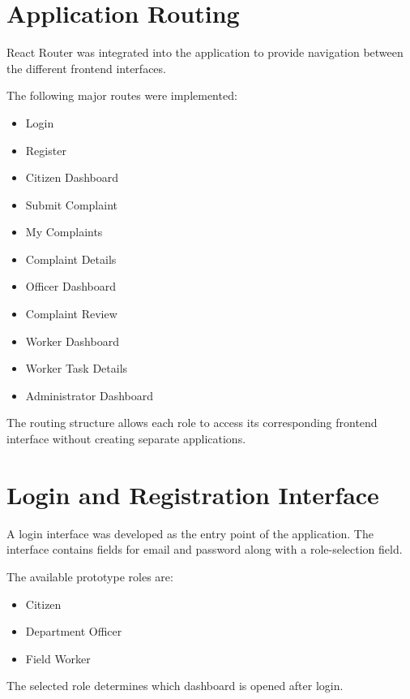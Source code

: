 \documentclass[12pt,a4paper]{article}
\begin{document}
\section{Application Routing}

React Router was integrated into the application to provide navigation
between the different frontend interfaces.

The following major routes were implemented:

\begin{itemize}
    \item Login
    \item Register
    \item Citizen Dashboard
    \item Submit Complaint
    \item My Complaints
    \item Complaint Details
    \item Officer Dashboard
    \item Complaint Review
    \item Worker Dashboard
    \item Worker Task Details
    \item Administrator Dashboard
\end{itemize}

The routing structure allows each role to access its corresponding frontend
interface without creating separate applications.

\section{Login and Registration Interface}

A login interface was developed as the entry point of the application. The
interface contains fields for email and password along with a role-selection
field.

The available prototype roles are:

\begin{itemize}
    \item Citizen
    \item Department Officer
    \item Field Worker
\end{itemize}

The selected role determines which dashboard is opened after login.
\end{document}
